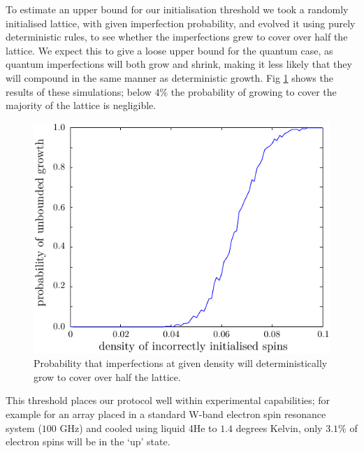 To estimate an upper bound for our initialisation threshold we took a randomly initialised lattice, with given imperfection probability, and evolved it using purely deterministic rules, to see whether the imperfections grew to cover over half the lattice. We expect this to give a loose upper bound for the quantum case, as quantum imperfections will both grow and shrink, making it less likely that they will compound in the same manner as deterministic growth. Fig \ref{flipthreshold} shows the results of these simulations; below $4\%$ the probability of growing to cover the majority of the lattice is negligible.
\begin{figure}[!h]
  \begin{center}
    \includegraphics{assets/flipthreshold.pdf}
  \end{center}
  \caption{Probability that imperfections at given density will deterministically grow to cover over half the lattice.}
  \label{flipthreshold}
\end{figure}

This threshold places our protocol well within experimental capabilities; for example for an array placed in a standard W-band electron spin resonance system ($100$ GHz) and cooled using liquid 4He to $1.4$ degrees Kelvin, only $3.1\%$ of electron spins will be in the `up' state.


